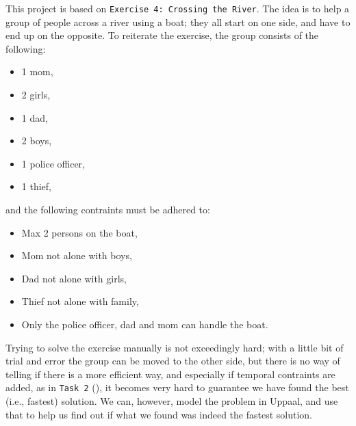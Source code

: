 This project is based on \texttt{Exercise 4: Crossing the River}. The idea is to help a group of people across a river using a boat; they all start on one side, and have to end up on the opposite. To reiterate the exercise, the group consists of the following:
\begin{itemize}
\setlength\itemsep{.1em}
	\item 1 mom,
	\item 2 girls,
	\item 1 dad,
	\item 2 boys,
	\item 1 police officer,
	\item 1 thief,
\end{itemize}

\noindent and the following contraints must be adhered to:

\begin{itemize}
\setlength\itemsep{.1em}
	\item Max 2 persons on the boat,
	\item Mom not alone with boys,
	\item Dad not alone with girls,
	\item Thief not alone with family,
	\item Only the police officer, dad and mom can handle the boat.
\end{itemize}

\noindent Trying to solve the exercise manually is not exceedingly hard; with a little bit of trial and error the group can be moved to the other side, but there is no way of telling if there is a more efficient way, and especially if temporal contraints are added, as in \texttt{Task 2} (), it becomes very hard to guarantee we have found the best (i.e., fastest) solution. We can, however, model the problem in Uppaal, and use that to help us find out if what we found was indeed the fastest solution.